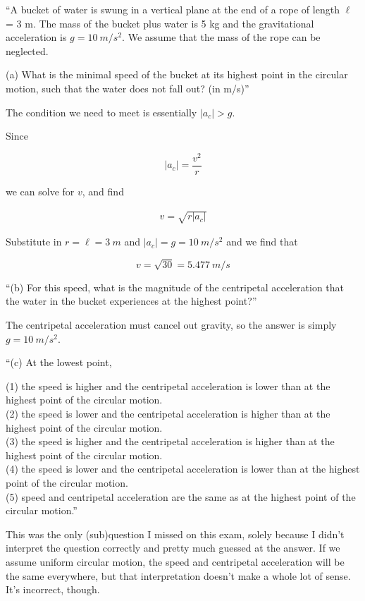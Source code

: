 \documentclass[8.01x]{subfiles}
\begin{document}
``A bucket of water is swung in a vertical plane at the end of a rope of length $\ell$ = 3 m. The mass of the bucket plus water is 5 kg and the gravitational acceleration is $g = \SI{10}{m/s^2}$. We assume that the mass of the rope can be neglected.

(a) What is the minimal speed of the bucket at its highest point in the circular motion, such that the water does not fall out? (in m/s)''

The condition we need to meet is essentially $|a_c| > g$.

Since

\begin{equation}
|a_c| = \frac{v^2}{r}
\end{equation}

we can solve for $v$, and find

\begin{align}
v = \sqrt{r |a_c|}
\end{align}

Substitute in $r = \ell = \SI{3}{m}$ and $|a_c| = g = \SI{10}{m/s^2}$ and we find that

\begin{equation}
v = \sqrt{30} = \SI{5.477}{m/s}
\end{equation}

``(b) For this speed, what is the magnitude of the centripetal acceleration that the water in the bucket experiences at the highest point?''

The centripetal acceleration must cancel out gravity, so the answer is simply $g = \SI{10}{m/s^2}$.

``(c) At the lowest point,

(1) the speed is higher and the centripetal acceleration is lower than at the highest point of the circular motion.\\
(2) the speed is lower and the centripetal acceleration is higher than at the highest point of the circular motion.\\
(3) the speed is higher and the centripetal acceleration is higher than at the highest point of the circular motion.\\
(4) the speed is lower and the centripetal acceleration is lower than at the highest point of the circular motion.\\
(5) speed and centripetal acceleration are the same as at the highest point of the circular motion.''

This was the only (sub)question I missed on this exam, solely because I didn't interpret the question correctly and pretty much guessed at the answer. If we assume uniform circular motion, the speed and centripetal acceleration will be the same everywhere, but that interpretation doesn't make a whole lot of sense. It's incorrect, though.
\end{document}
